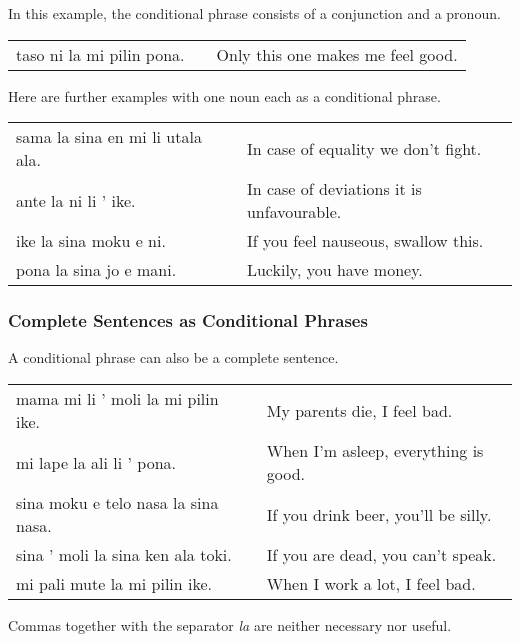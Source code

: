 In this example, the conditional phrase consists of a conjunction and a pronoun. 

\begin{supertabular}{p{5,5cm}|ll}
taso ni la mi pilin pona. && Only this one makes me feel good. \\
\end{supertabular} 

Here are further examples with one noun each as a conditional phrase.

\begin{supertabular}{p{5,5cm}|ll}
sama la sina en mi li utala ala. && In case of equality we don't fight. \\
ante la ni li ' ike. && In case of deviations it is unfavourable.  \\
ike la sina moku e ni. && If you feel nauseous, swallow this. \\
pona la sina jo e mani. && Luckily, you have money. \\
\end{supertabular} 

%
\subsubsection*{Complete Sentences as Conditional Phrases}
%
A conditional phrase can also be a complete sentence.

\begin{supertabular}{p{5,5cm}|ll}
mama mi li ' moli la mi pilin ike. && My parents die, I feel bad. \\
mi lape la ali li ' pona. && When I'm asleep, everything is good. \\
sina moku e telo nasa la sina nasa. && If you drink beer, you'll be silly. \\
sina ' moli la sina ken ala toki. && If you are dead, you can't speak. \\
mi pali mute la mi pilin ike. && When I work a lot, I feel bad. \\
\end{supertabular} 

Commas together with the separator \textit{la} are neither necessary nor useful. 

%
